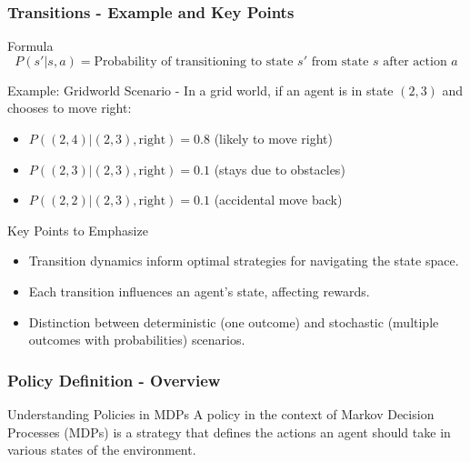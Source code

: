 \documentclass[aspectratio=169]{beamer}
\begin{document}
\begin{frame}[fragile]
    \frametitle{Transitions - Example and Key Points}
    \begin{block}{Formula}
        \begin{equation}
            P(s'|s, a) = \text{Probability of transitioning to state } s' \text{ from state } s \text{ after action } a
        \end{equation}
    \end{block}
    
    \begin{block}{Example: Gridworld Scenario}
        - In a grid world, if an agent is in state \( (2, 3) \) and chooses to move right:
            \begin{itemize}
                \item \( P((2, 4)|(2, 3), \text{right}) = 0.8 \) (likely to move right)
                \item \( P((2, 3)|(2, 3), \text{right}) = 0.1 \) (stays due to obstacles)
                \item \( P((2, 2)|(2, 3), \text{right}) = 0.1 \) (accidental move back)
            \end{itemize}
    \end{block}
    
    \begin{block}{Key Points to Emphasize}
        \begin{itemize}
            \item Transition dynamics inform optimal strategies for navigating the state space.
            \item Each transition influences an agent's state, affecting rewards.
            \item Distinction between deterministic (one outcome) and stochastic (multiple outcomes with probabilities) scenarios.
        \end{itemize}
    \end{block}
\end{frame}

\begin{frame}[fragile]
    \frametitle{Policy Definition - Overview}
    \begin{block}{Understanding Policies in MDPs}
        A policy in the context of Markov Decision Processes (MDPs) is a strategy that defines the actions an agent should take in various states of the environment.
    \end{block}
\end{frame}
\end{document}
